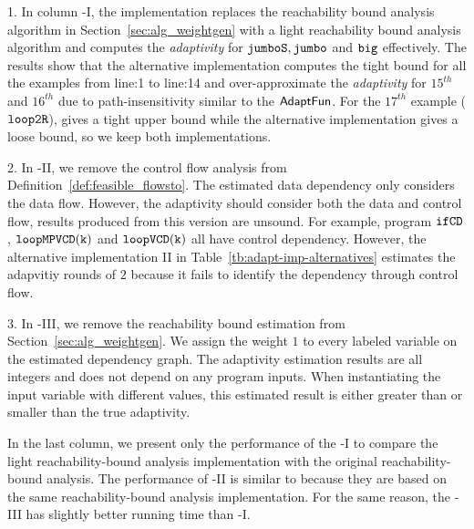 1. In column {\THESYSTEM}-I, the implementation replaces the reachability bound analysis algorithm in Section~\ref{sec:alg_weightgen} with a light reachability bound analysis algorithm and computes the \emph{adaptivity} for
$\mathtt{jumboS}, \mathtt{jumbo}$ and $\mathtt{big}$ effectively.
The results show that the alternative implementation computes the tight bound for all the examples from line:1 to line:14
and over-approximate the \emph{adaptivity} for $15^{th}$ and $16^{th}$ due to path-insensitivity similar to the
$\textsf{AdaptFun}$.
For the $17^{th}$ example ($\mathtt{loop2R}$), {\THESYSTEM} gives a tight upper bound while the alternative implementation gives a loose bound, so we keep both implementations.

2. In {\THESYSTEM}-II, we remove the control flow analysis from Definition~\ref{def:feasible_flowsto}.
The estimated data dependency only considers the data flow.
However, the adaptivity should consider both the data and control flow, results produced from this version are unsound.
For example, program $\mathtt{ifCD}$, $ \mathtt{loopMPVCD(k)} $ and $\mathtt{loopVCD(k)} $ all have control dependency.
However, the alternative implementation II in Table~\ref{tb:adapt-imp-alternatives} estimates the adapvitiy rounds of $2$ because it fails to identify the dependency through control flow.


3. In {\THESYSTEM}-III, we remove the reachability bound estimation from Section~\ref{sec:alg_weightgen}.
We assign the weight $1$ to every labeled variable on the estimated dependency graph.
The adaptivity estimation results are all integers and does not depend on any program inputs.
When instantiating the input variable with different values, this estimated result is either greater than or smaller than the true adaptivity.

In the last column, we present only the performance of the {\THESYSTEM}-I to compare the
light reachability-bound analysis implementation with the original reachability-bound analysis.
The performance of {\THESYSTEM}-II is similar to {\THESYSTEM} because they are based on the same
reachability-bound analysis implementation. For the same reason, the {\THESYSTEM}-III has slightly better
running time than {\THESYSTEM}-I.


